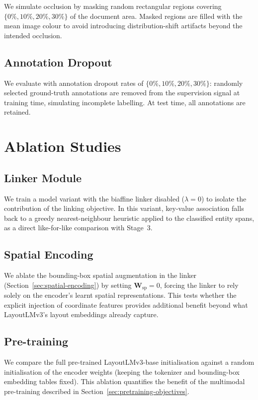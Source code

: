 We simulate occlusion by masking random rectangular regions covering
$\{0\%, 10\%, 20\%, 30\%\}$ of the document area. Masked regions are
filled with the mean image colour to avoid introducing distribution-shift
artifacts beyond the intended occlusion.

\subsection{Annotation Dropout}
\label{sec:annotation-dropout}

We evaluate with annotation dropout rates of
$\{0\%, 10\%, 20\%, 30\%\}$: randomly selected ground-truth annotations
are removed from the supervision signal at training time, simulating
incomplete labelling. At test time, all annotations are retained.

\section{Ablation Studies}
\label{sec:ablation-studies}

\subsection{Linker Module}
\label{sec:ablation-linker}

We train a model variant with the biaffine linker disabled ($\lambda = 0$)
to isolate the contribution of the linking objective. In this variant, key-value
association falls back to a greedy nearest-neighbour heuristic applied to the
classified entity spans, as a direct like-for-like comparison with Stage~3.

\subsection{Spatial Encoding}
\label{sec:ablation-spatial}

We ablate the bounding-box spatial augmentation in the linker
(Section~\ref{sec:spatial-encoding}) by setting $\mathbf{W}_{\text{sp}} = 0$,
forcing the linker to rely solely on the encoder's learnt spatial representations.
This tests whether the explicit injection of coordinate features provides
additional benefit beyond what LayoutLMv3's layout embeddings already capture.

\subsection{Pre-training}
\label{sec:ablation-pretraining}

We compare the full pre-trained LayoutLMv3-base initialisation against a
random initialisation of the encoder weights (keeping the tokenizer and
bounding-box embedding tables fixed). This ablation quantifies the benefit
of the multimodal pre-training described in
Section~\ref{sec:pretraining-objectives}.
